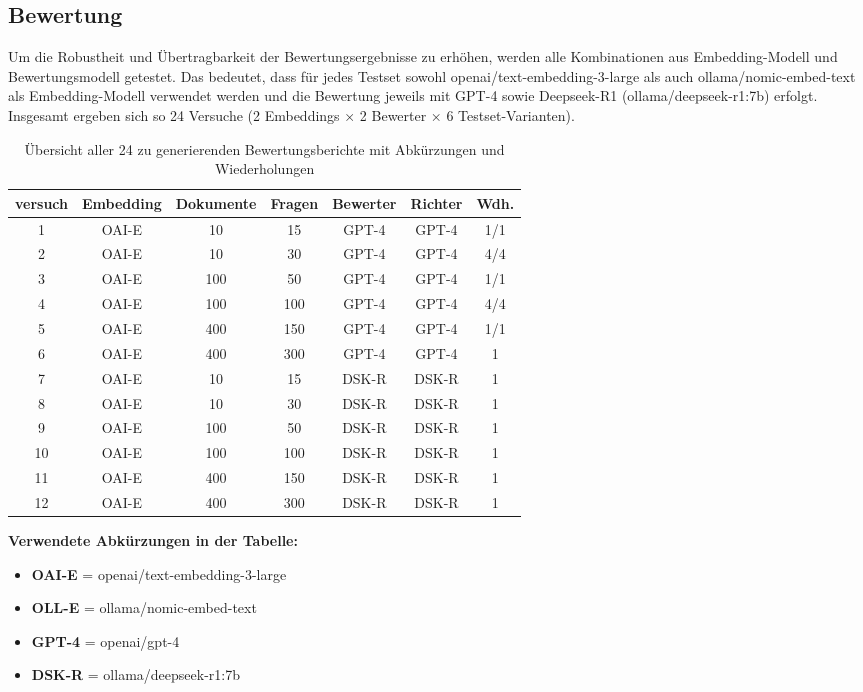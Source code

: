 \subsection{Bewertung}
Um die Robustheit und Übertragbarkeit der Bewertungsergebnisse zu erhöhen, werden alle Kombinationen aus Embedding-Modell und Bewertungsmodell getestet. Das bedeutet, dass für jedes Testset sowohl openai/text-embedding-3-large als auch ollama/nomic-embed-text als Embedding-Modell verwendet werden und die Bewertung jeweils mit GPT-4 sowie Deepseek-R1 (ollama/deepseek-r1:7b) erfolgt. Insgesamt ergeben sich so 24 Versuche (2 Embeddings × 2 Bewerter × 6 Testset-Varianten).

\begin{table}[htbp]
    \centering
    \begin{tabular}{|c|c|c|c|c|c|c|}
        \hline
        \textbf{versuch} & \textbf{Embedding} & \textbf{Dokumente} & \textbf{Fragen} & \textbf{Bewerter} & \textbf{Richter} & \textbf{Wdh.} \\
        \hline
        1  & OAI-E & 10   & 15  & GPT-4 & GPT-4 & 1/1 \\
        2  & OAI-E & 10   & 30  & GPT-4 & GPT-4 & 4/4 \\
        3  & OAI-E & 100  & 50  & GPT-4 & GPT-4 & 1/1 \\
        4  & OAI-E & 100  & 100 & GPT-4 & GPT-4 & 4/4 \\
        5  & OAI-E & 400 & 150 & GPT-4 & GPT-4 & 1/1 \\
        6  & OAI-E & 400 & 300 & GPT-4 & GPT-4 & 1 \\
        \hline
        7  & OAI-E & 10   & 15  & DSK-R & DSK-R & 1 \\
        8  & OAI-E & 10   & 30  & DSK-R & DSK-R & 1 \\
        9  & OAI-E & 100  & 50  & DSK-R & DSK-R & 1 \\
        10 & OAI-E & 100  & 100 & DSK-R & DSK-R & 1 \\
        11 & OAI-E & 400 & 150 & DSK-R & DSK-R & 1 \\
        12 & OAI-E & 400 & 300 & DSK-R & DSK-R & 1 \\
        \hline
    \end{tabular}
    \caption{Übersicht aller 24 zu generierenden Bewertungsberichte mit Abkürzungen und Wiederholungen}
    \label{tab:bewertungsberichte}
\end{table}

\noindent
\textbf{Verwendete Abkürzungen in der Tabelle:}
\begin{itemize}
    \item \textbf{OAI-E} = openai/text-embedding-3-large
    \item \textbf{OLL-E} = ollama/nomic-embed-text
    \item \textbf{GPT-4} = openai/gpt-4
    \item \textbf{DSK-R} = ollama/deepseek-r1:7b
\end{itemize} 